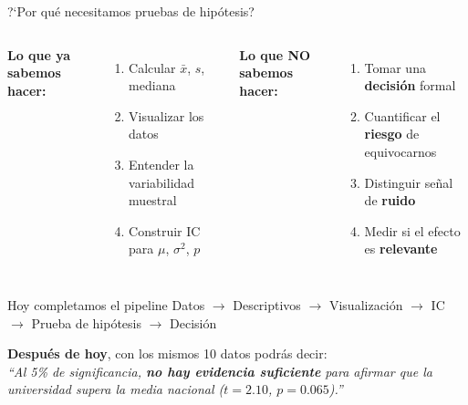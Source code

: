 \documentclass[aspectratio=169, 11pt]{beamer}
\begin{document}
\begin{frame}{?`Por qu\'e necesitamos pruebas de hip\'otesis?}
\small

\begin{columns}[T]
\textbf{Lo que ya sabemos hacer:}
\begin{enumerate}\setlength{\itemsep}{2pt}
  \item[S01] Calcular $\bar{x}$, $s$, mediana
  \item[S02] Visualizar los datos
  \item[S03] Entender la variabilidad muestral
  \item[S04] Construir IC para $\mu$, $\sigma^2$, $p$
\end{enumerate}

\textbf{Lo que \alert{NO} sabemos hacer:}
\begin{enumerate}\setlength{\itemsep}{2pt}
  \item Tomar una \textbf{decisi\'on} formal
  \item Cuantificar el \textbf{riesgo} de equivocarnos
  \item Distinguir se\~nal de \textbf{ruido}
  \item Medir si el efecto es \textbf{relevante}
\end{enumerate}
\end{columns}

\vspace{0.4cm}
\begin{exampleblock}{Hoy completamos el pipeline}
\centering
\small
Datos $\to$ Descriptivos $\to$ Visualizaci\'on $\to$ IC $\to$ \alert{Prueba de hip\'otesis} $\to$ \alert{Decisi\'on}
\end{exampleblock}

\vspace{0.2cm}
\textbf{Despu\'es de hoy}, con los mismos 10 datos podr\'as decir:\\
\emph{``Al 5\% de significancia, \textbf{no hay evidencia suficiente} para afirmar que la universidad supera la media nacional ($t = 2.10$, $p = 0.065$).''}
\end{frame}
\end{document}
